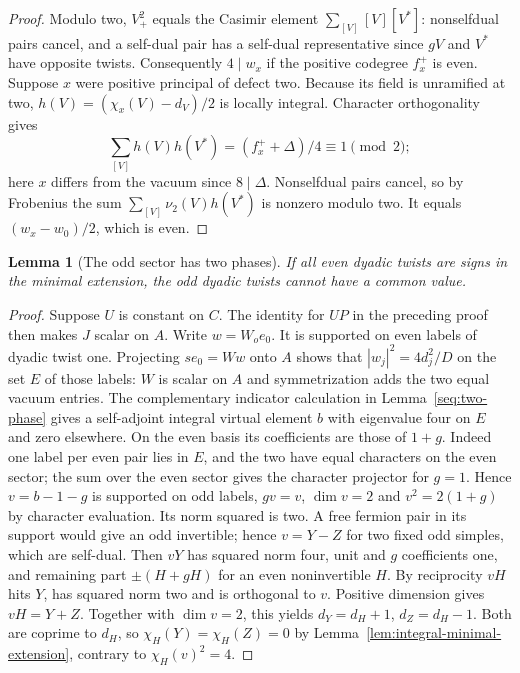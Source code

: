 \documentclass[11pt,a4paper]{article}
\numberwithin{equation}{section}
\newtheorem{lemma}[theorem]{Lemma}
\theoremstyle{remark}
\begin{document}
\begin{proof}
Modulo two, $V_+^2$ equals the Casimir element
$\sum_{[V]}[V][V^*]$: nonselfdual pairs cancel, and a self-dual
pair has a self-dual representative since $gV$ and $V^*$ have
opposite twists. Consequently $4\mid w_x$ if the positive codegree
$f_x^+$ is even. Suppose $x$ were positive principal of defect two.
Because its field is unramified at two,
$h(V)=(\chi_x(V)-d_V)/2$ is locally integral. Character
orthogonality gives
\[
 \sum_{[V]}h(V)h(V^*)=(f_x^++\Delta)/4\equiv1\pmod2;
\]
here $x$ differs from the vacuum since $8\mid\Delta$.
Nonselfdual pairs cancel, so by Frobenius the sum
$\sum_{[V]}\nu_2(V)h(V^*)$ is nonzero modulo two. It equals
$(w_x-w_0)/2$, which is even.
\end{proof}

\begin{lemma}[The odd sector has two phases]\label{seq:fermion-one-spin}
If all even dyadic twists are signs in the minimal extension,
the odd dyadic twists cannot have a common value.
\end{lemma}
\begin{proof}
Suppose $U$ is constant on $C$. The identity for $UP$ in the
preceding proof then makes $J$ scalar on $A$. Write $w=W_oe_0$.
It is supported on even labels of dyadic twist one.
Projecting $se_0=Ww$ onto $A$ shows that
$|w_j|^2=4d_j^2/D$ on the set $E$ of those labels: $W$ is
scalar on $A$ and symmetrization adds the two equal vacuum entries.
The complementary indicator calculation in Lemma~\ref{seq:two-phase}
gives a self-adjoint integral virtual element $b$ with eigenvalue
four on $E$ and zero elsewhere. On the even basis its coefficients
are those of $1+g$. Indeed one label per even pair lies in $E$,
and the two have equal characters on the even sector; the sum
over the even sector gives the character projector for $g=1$.
Hence $v=b-1-g$ is supported on odd labels, $gv=v$, $\dim v=2$
and $v^2=2(1+g)$ by character evaluation. Its norm squared is two.
A free fermion pair in its support would give an odd invertible;
hence $v=Y-Z$ for two fixed odd simples, which are self-dual.
Then $vY$ has squared norm four, unit and $g$ coefficients one,
and remaining part $\pm(H+gH)$ for an even noninvertible $H$.
By reciprocity $vH$ hits $Y$, has squared norm two and is
orthogonal to $v$. Positive dimension gives $vH=Y+Z$.
Together with $\dim v=2$, this yields
$d_Y=d_H+1$, $d_Z=d_H-1$. Both are coprime to $d_H$, so
$\chi_H(Y)=\chi_H(Z)=0$ by Lemma~\ref{lem:integral-minimal-extension},
contrary to $\chi_H(v)^2=4$.
\end{proof}
\end{document}

